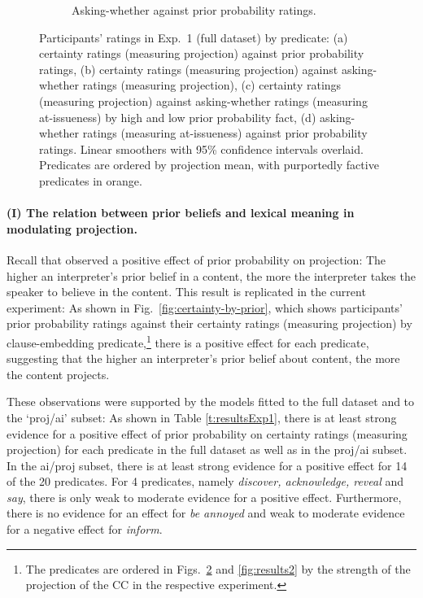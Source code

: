 \documentclass[11pt,fleqn]{article}
\newcommand{\6}{\mbox{$[\hspace*{-.6mm}[$}}
\newcommand{\9}{\mbox{$]\hspace*{-.6mm}]$}}
\begin{document}
\begin{figure}[h!]
\begin{subfigure}[t]{0.49\textwidth}
\caption{Asking-whether against prior probability ratings.}\label{fig:ai-by-prior}
\end{subfigure} 
  
\caption{Participants' ratings in Exp.~1 (full dataset) by predicate: (a) certainty ratings (measuring projection) against prior probability ratings, (b) certainty ratings (measuring projection) against asking-whether ratings (measuring projection), (c) certainty ratings (measuring projection) against asking-whether ratings (measuring at-issueness) by high and low prior probability fact, (d) asking-whether ratings (measuring at-issueness) against prior probability ratings. Linear smoothers with 95\% confidence intervals overlaid. Predicates are ordered by projection mean, with purportedly factive predicates in orange.}\label{fig:results1}
\end{figure}

\paragraph{(I) The relation between prior beliefs and lexical meaning in modulating projection.} Recall that \citealt{degen-tonhauser-openmind} observed a positive effect of prior probability on projection: The higher an interpreter's prior belief in a content, the more the interpreter takes the speaker to believe in the content. This result is replicated in the current experiment: As shown in Fig.~\ref{fig:certainty-by-prior}, which shows participants' prior probability ratings against their certainty ratings (measuring projection) by clause-embedding predicate,\footnote{The predicates are ordered in Figs.~\ref{fig:results1} and \ref{fig:results2} by the strength of the projection of the CC in the respective experiment.} there is a positive effect for each predicate, suggesting that the higher an interpreter's prior belief about content, the more the content projects.

These observations were supported by the models fitted to the full dataset and to the `proj/ai' subset: As shown in Table \ref{t:resultsExp1}, there is at least strong evidence for a positive effect of prior probability on certainty ratings (measuring projection) for each predicate in the full dataset as well as in the proj/ai subset. In the ai/proj subset, there is at least strong evidence for a positive effect for 14 of the 20 predicates. For 4 predicates, namely {\em discover, acknowledge, reveal} and {\em say}, there is only weak to moderate evidence for a positive effect. Furthermore, there is no evidence for an effect for {\em be annoyed} and weak to moderate evidence for a negative effect for {\em inform}. 
\end{document}
